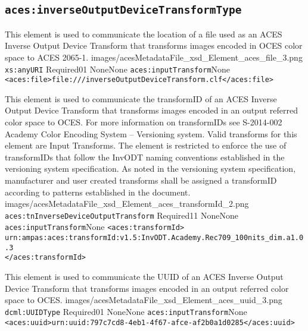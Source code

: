 \subsection{\texttt{aces:inverseOutputDeviceTransformType}}
		
		{This element is used to communicate the location of a file used as an ACES Inverse Output Device Transform that transforms images encoded in OCES color space to ACES 2065-1.}
		{images/acesMetadataFile_xsd_Element_aces_file_3.png}
		{\texttt{xs:anyURI}}
		{Required}{0}{1}
		{None}{None}
		{\texttt{aces:inputTransform}}{None}
		{\lstinline{<aces:file>file:///inverseOutputDeviceTransform.clf</aces:file>}}

        {This element is used to communicate the transformID of an ACES Inverse Output Device Transform that transforms images encoded in an output referred color space to OCES.  For more information on transformIDs see S-2014-002 Academy Color Encoding System -- Versioning system.  Valid transforms for this element are Input Transforms.  The element is restricted to enforce the use of transformIDs that follow the InvODT naming conventions established in the versioning system specification.  As noted in the versioning system specification, manufacturer and user created transforms shall be assigned a transformID according to patterns established in the document.}
        {images/acesMetadataFile_xsd_Element_aces_transformId_2.png}
        {\texttt{aces:tnInverseDeviceOutputTransform}}
        {Required}{1}{1}
        {None}{None}
        {\texttt{aces:inputTransform}}{None}
        {\lstinline{<aces:transformId>} \\
        \lstinline{urn:ampas:aces:transformId:v1.5:InvODT.Academy.Rec709_100nits_dim.a1.0.3} \\
        \lstinline{</aces:transformId>}}

		{This element is used to communicate the UUID of an ACES Inverse Output Device Transform that transforms images encoded in an output referred color space to OCES.}
		{images/acesMetadataFile_xsd_Element_aces_uuid_3.png}
		{\texttt{dcml:UUIDType}}
		{Required}{0}{1}
		{None}{None}
		{\texttt{aces:inputTransform}}{None}
		{\lstinline{<aces:uuid>urn:uuid:797c7cd8-4eb1-4f67-afce-af2b0a1d0285</aces:uuid>}}